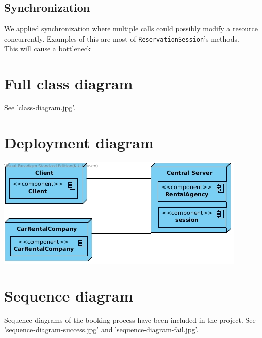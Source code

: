 \documentclass{scrartcl}
\begin{document}
    \subsection{Synchronization}
	We applied synchronization where multiple calls could possibly modify a resource
	concurrently. Examples of this are most of \texttt{ReservationSession}'s methods.\\
	This will cause a bottleneck
	
	\section{Full class diagram}
    See 'class-diagram.jpg'.

	\section{Deployment diagram}
    \includegraphics{deployment-diagram.jpg}

    \section{Sequence diagram}
    Sequence diagrams of the booking process have been included in the project.
    See 'sequence-diagram-success.jpg' and 'sequence-diagram-fail.jpg'.

\end{document}
